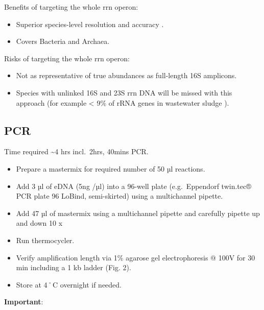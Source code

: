 \documentclass[
]{book}
\providecommand{\tightlist}{%
  \setlength{\itemsep}{0pt}\setlength{\parskip}{0pt}}
\begin{document}
Benefits of targeting the whole rrn operon:

\begin{itemize}
\tightlist
\item
  Superior species-level resolution and accuracy \citep{Cusco2018, Srinivas2024}.\\
\item
  Covers Bacteria and Archaea.
\end{itemize}

Risks of targeting the whole rrn operon:

\begin{itemize}
\tightlist
\item
  Not as representative of true abundances as full-length 16S amplicons.\\
\item
  Species with unlinked 16S and 23S rrn DNA will be missed with this approach (for example \textless{} 9\% of rRNA genes in wastewater sludge \citep{Brewer2020}).
\end{itemize}

\subsection{PCR}\label{pcr}

Time required \textasciitilde4 hrs incl.~2hrs, 40mins PCR.

\begin{itemize}
\tightlist
\item
  Prepare a mastermix for required number of 50 µl reactions.
\item
  Add 3 µl of eDNA (5ng /µl) into a 96-well plate (e.g.~Eppendorf twin.tec® PCR plate 96 LoBind, semi-skirted) using a multichannel pipette.\\
\item
  Add 47 µl of mastermix using a multichannel pipette and carefully pipette up and down 10 x
\item
  Run thermocycler.
\item
  Verify amplification length via 1\% agarose gel electrophoresis @ 100V for 30 min including a 1 kb ladder (Fig. 2).
\item
  Store at 4˚C overnight if needed.
\end{itemize}

\textbf{Important}:
\end{document}
